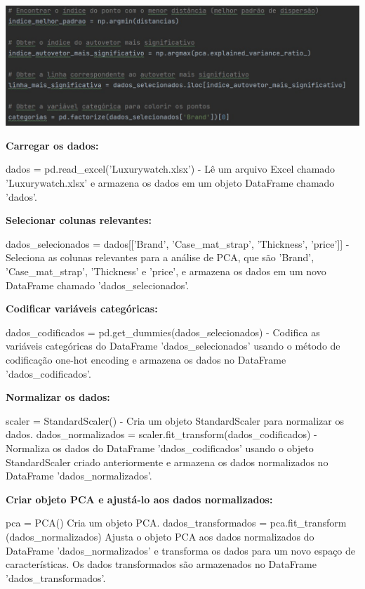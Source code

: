 \documentclass[12pt, a4paper]{article}
\begin{document}
\begin{center}
    \includegraphics[width=14cm]{figura 3.jpg}
\end{center} 





\textbf{Carregar os dados:}


dados = pd.read\_excel('Luxurywatch.xlsx')  - Lê um arquivo Excel 
chamado 'Luxurywatch.xlsx' e armazena os dados em um objeto DataFrame 
chamado 'dados'.


\textbf{Selecionar colunas relevantes:}


dados\_selecionados = dados[['Brand', 'Case\_mat\_strap', 
'Thickness', 'price']]  - Seleciona as colunas relevantes para a 
análise de PCA, que são 'Brand', 'Case\_mat\_strap', 
'Thickness' e 'price', e armazena os dados em um novo DataFrame 
chamado 'dados\_selecionados'.


\textbf{Codificar variáveis categóricas:}


dados\_codificados = pd.get\_dummies(dados\_selecionados)  - Codifica 
as variáveis categóricas do DataFrame 'dados\_selecionados'
usando o método de codificação one-hot encoding e armazena 
os dados no DataFrame 'dados\_codificados'.


\textbf{Normalizar os dados:}


scaler = StandardScaler()  - Cria um objeto StandardScaler 
para normalizar os dados.
dados\_normalizados = scaler.fit\_transform(dados\_codificados) 
- Normaliza os dados do DataFrame 'dados\_codificados' usando 
o objeto StandardScaler criado anteriormente e armazena os 
dados normalizados no DataFrame 'dados\_normalizados'.


\textbf{Criar objeto PCA e ajustá-lo aos dados normalizados:}

pca = PCA()   Cria um objeto PCA.
dados\_transformados = pca.fit\_transform
(dados\_normalizados) 
Ajusta o objeto PCA aos dados normalizados do
DataFrame 'dados\_normalizados' e transforma os dados
para um novo espaço de características. Os dados 
transformados são armazenados no DataFrame 'dados\_transformados'.
\end{document}

